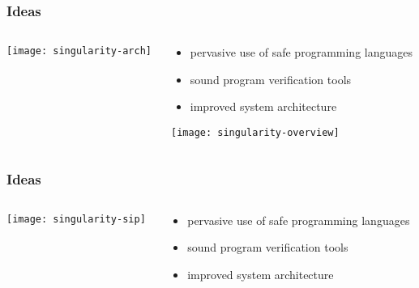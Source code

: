 \begin{frame}[plain]
	\frametitle{Ideas}
	
	
	
	\begin{columns}
		
		\begin{column}{.5\textwidth}
			
			\texttt{[image: singularity-arch]}
			
		\end{column}
		
		\begin{column}{.5\textwidth}
			
			\begin{itemize}
				\item pervasive use of safe programming languages
				\item sound program verification tools
				\item improved system architecture
				
			\end{itemize}	
			\centering
			\texttt{[image: singularity-overview]}
		\end{column}
		
		
	\end{columns}
	

\end{frame}


\begin{frame}[plain]
	\frametitle{Ideas}
	
	
	
	\begin{columns}
		
		\begin{column}{.5\textwidth}
			
			\texttt{[image: singularity-sip]}
			
		\end{column}
		
		\begin{column}{.5\textwidth}
			
			\begin{itemize}
				\item pervasive use of safe programming languages
				\item sound program verification tools
				\item improved system architecture
				
			\end{itemize}	
			
		\end{column}
		
		
	\end{columns}
	
	
\end{frame}


